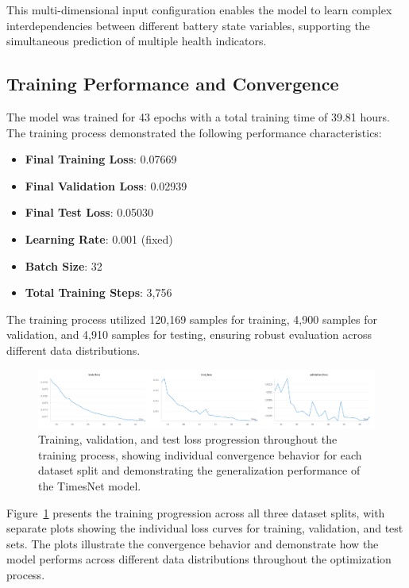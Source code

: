 This multi-dimensional input configuration enables the model to learn complex interdependencies between different battery state variables, supporting the simultaneous prediction of multiple health indicators.

\subsection{Training Performance and Convergence}
\label{subsec:training_performance}

The model was trained for 43 epochs with a total training time of 39.81 hours. The training process demonstrated the following performance characteristics:

\begin{itemize}
    \item \textbf{Final Training Loss}: 0.07669
    \item \textbf{Final Validation Loss}: 0.02939
    \item \textbf{Final Test Loss}: 0.05030
    \item \textbf{Learning Rate}: 0.001 (fixed)
    \item \textbf{Batch Size}: 32
    \item \textbf{Total Training Steps}: 3,756
\end{itemize}

The training process utilized 120,169 samples for training, 4,900 samples for validation, and 4,910 samples for testing, ensuring robust evaluation across different data distributions.

\begin{figure}[htbp]
\centering
\includegraphics[width=1.0\textwidth]{imgs/loss_funtions.png}
\caption{Training, validation, and test loss progression throughout the training process, showing individual convergence behavior for each dataset split and demonstrating the generalization performance of the TimesNet model.}
\label{fig:training_losses}
\end{figure}

Figure~\ref{fig:training_losses} presents the training progression across all three dataset splits, with separate plots showing the individual loss curves for training, validation, and test sets. The plots illustrate the convergence behavior and demonstrate how the model performs across different data distributions throughout the optimization process.

